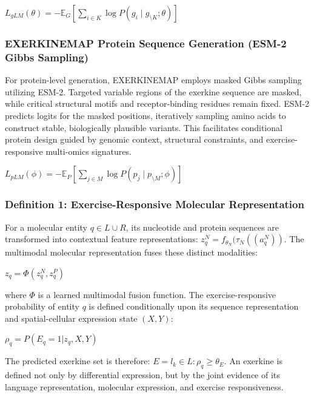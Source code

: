\documentclass[11pt]{article}
\begin{document}
$L_{gLM}(\theta)=-\mathbb{E}_G\left[\sum_{i\in K}\log P(g_i \mid g_{\setminus K};\theta)\right]$

\subsubsection{EXERKINEMAP Protein Sequence Generation (ESM-2 Gibbs Sampling)}
For protein-level generation, EXERKINEMAP employs masked Gibbs sampling utilizing ESM-2. Targeted variable regions of the exerkine sequence are masked, while critical structural motifs and receptor-binding residues remain fixed. ESM-2 predicts logits for the masked positions, iteratively sampling amino acids to construct stable, biologically plausible variants. This facilitates conditional protein design guided by genomic context, structural constraints, and exercise-responsive multi-omics signatures.

$L_{pLM}(\phi) = -\mathbb{E}_P\left[\sum_{j\in M}\log P(p_j \mid p_{\setminus M};\phi)\right]$

\subsubsection{Definition 1: Exercise-Responsive Molecular Representation}
For a molecular entity $q \in L \cup R$, its nucleotide and protein sequences are transformed into contextual feature representations: $z_q^N = f_{\theta_N} (\tau_N((a_q^N))$. The multimodal molecular representation fuses these distinct modalities: 

$z_q = \Phi (z_q^N, z_q^P)$

where $\Phi$ is a learned multimodal fusion function. The exercise-responsive probability of entity $q$ is defined conditionally upon its sequence representation and spatial-cellular expression state $(X,Y)$:

$\rho_q = P(E_q = 1|z_q,X,Y)$

The predicted exerkine set is therefore: $E = {l_k \in L : \rho_q \geq \theta_E}$. An exerkine is defined not only by differential expression, but by the joint evidence of its language representation, molecular expression, and exercise responsiveness. 
\end{document}
